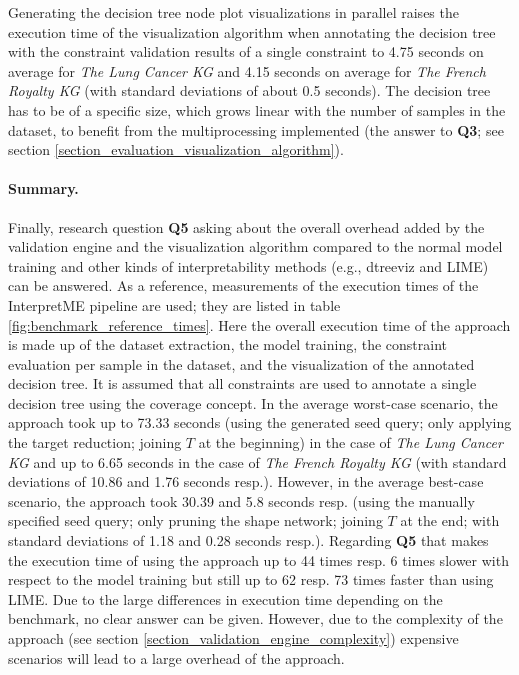 Generating the decision tree node plot visualizations in parallel raises the execution time of the visualization algorithm when annotating the decision tree with the constraint validation results of a single constraint to 4.75 seconds on average for \textit{The Lung Cancer KG} and 4.15 seconds on average for \textit{The French Royalty KG} (with standard deviations of about 0.5 seconds). The decision tree has to be of a specific size, which grows linear with the number of samples in the dataset, to benefit from the multiprocessing implemented (the answer to \textbf{Q3}; see section \ref{section_evaluation_visualization_algorithm}).

\paragraph{Summary.} Finally, research question \textbf{Q5} asking about the overall overhead added by the validation engine and the visualization algorithm compared to the normal model training and other kinds of interpretability methods (e.g., dtreeviz and LIME) can be answered. As a reference, measurements of the execution times of the InterpretME pipeline are used; they are listed in table \ref{fig:benchmark_reference_times}. Here the overall execution time of the approach is made up of the dataset extraction, the model training, the constraint evaluation per sample in the dataset, and the visualization of the annotated decision tree. It is assumed that all constraints are used to annotate a single decision tree using the coverage concept. In the average worst-case scenario, the approach took up to 73.33 seconds (using the generated seed query; only applying the target reduction; joining $T$ at the beginning) in the case of \textit{The Lung Cancer KG} and up to 6.65 seconds in the case of \textit{The French Royalty KG} (with standard deviations of 10.86 and 1.76 seconds resp.). However, in the average best-case scenario, the approach took 30.39 and 5.8 seconds resp. (using the manually specified seed query; only pruning the shape network; joining $T$ at the end; with standard deviations of 1.18 and 0.28 seconds resp.). Regarding \textbf{Q5} that makes the execution time of using the approach up to 44 times resp. 6 times slower with respect to the model training but still up to 62 resp. 73 times faster than using LIME. Due to the large differences in execution time depending on the benchmark, no clear answer can be given. However, due to the complexity of the approach (see section \ref{section_validation_engine_complexity}) expensive scenarios will lead to a large overhead of the approach.

